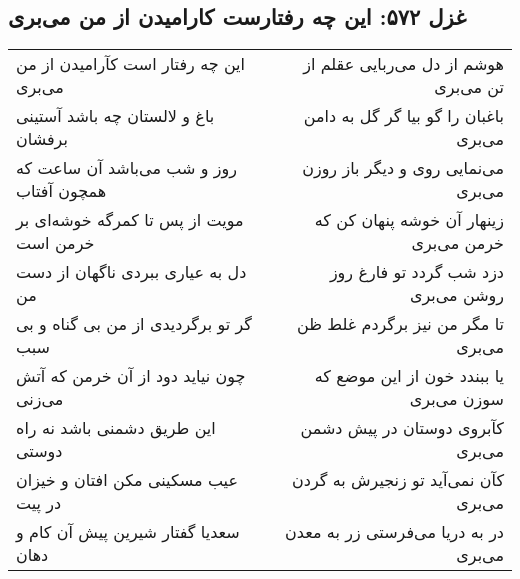 \begin{center}
\section*{غزل ۵۷۲: این چه رفتارست کارامیدن از من می‌بری}
\label{sec:572}
\begin{longtable}{l p{0.5cm} r}
این چه رفتار است کآرامیدن از من می‌بری
&&
هوشم از دل می‌ربایی عقلم از تن می‌بری
\\
باغ و لالستان چه باشد آستینی برفشان
&&
باغبان را گو بیا گر گل به دامن می‌بری
\\
روز و شب می‌باشد آن ساعت که همچون آفتاب
&&
می‌نمایی روی و دیگر باز روزن می‌بری
\\
مویت از پس تا کمرگه خوشه‌ای بر خرمن است
&&
زینهار آن خوشه پنهان کن که خرمن می‌بری
\\
دل به عیاری ببردی ناگهان از دست من
&&
دزد شب گردد تو فارغ روز روشن می‌بری
\\
گر تو برگردیدی از من بی گناه و بی سبب
&&
تا مگر من نیز برگردم غلط ظن می‌بری
\\
چون نیاید دود از آن خرمن که آتش می‌زنی
&&
یا ببندد خون از این موضع که سوزن می‌بری
\\
این طریق دشمنی باشد نه راه دوستی
&&
کآبروی دوستان در پیش دشمن می‌بری
\\
عیب مسکینی مکن افتان و خیزان در پیت
&&
کآن نمی‌آید تو زنجیرش به گردن می‌بری
\\
سعدیا گفتار شیرین پیش آن کام و دهان
&&
در به دریا می‌فرستی زر به معدن می‌بری
\\
\end{longtable}
\end{center}
